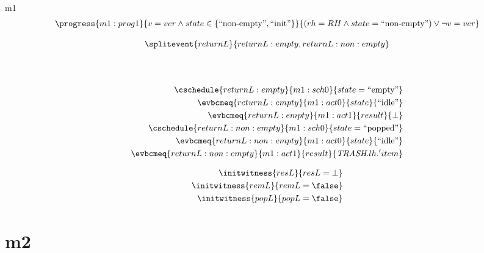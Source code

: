 \documentclass[12pt]{amsart}
\newcommand{\trash}{\textit{TRASH}}
\newcommand{\cEmpty}{\text{``empty''}}
\newcommand{\cNonEmpty}{\text{``non-empty''}}
\newcommand{\cInit}{\text{``init''}}
\newcommand{\cPopped}{\text{``popped''}}
\newcommand{\cBot}{\text{``idle''}}
\begin{document}
\begin{machine}{m1}
\begin{align*}
  \progress{m1:prog1}
    {v = ver \land state \in \{ \cNonEmpty, \cInit \} }
    {(rh = RH \land state = \cNonEmpty) \lor \neg v = ver}
\end{align*}

\[ \splitevent{returnL}{returnL:empty,returnL:non:empty} \]
     \\
      \\
\begin{align*}
  \cschedule{returnL:empty}{m1:sch0}{state = \cEmpty} \\
  \evbcmeq{returnL:empty}{m1:act0}{state}{\cBot} \\
  \evbcmeq{returnL:empty}{m1:act1}{result}{\bot} \\
  \cschedule{returnL:non:empty}{m1:sch0}{state = \cPopped} \\
  \evbcmeq{returnL:non:empty}{m1:act0}{state}{\cBot} \\
  \evbcmeq{returnL:non:empty}{m1:act1}{result}{\trash.lh.'item} \\
\end{align*}

\begin{align*}
  \initwitness{resL}{resL = \bot} \\
  \initwitness{remL}{remL = \false}\\
  \initwitness{popL}{popL = \false}
\end{align*}

\end{machine}

\section{m2}

\end{document}
